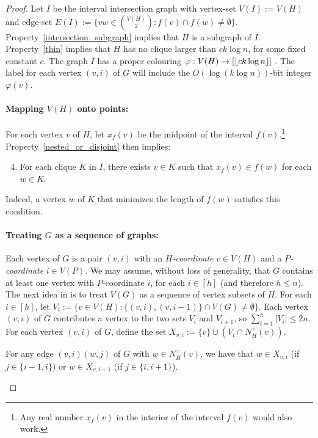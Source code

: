 \documentclass{patmorin}
\makeatletter
\renewcommand{\le}{\leqslant}
\newcommand{\defin}[1]{\emph{\textcolor{brightmaroon}{#1}}}
\def\mathcolor#1#{\@mathcolor{#1}}
\def\@mathcolor#1#2#3{%
  \protect\leavevmode
  \begingroup
    \color#1{#2}#3%
  \endgroup
}
\newcommand{\mathdefin}[1]{\mathcolor{brightmaroon}{#1}}
\newcommand{\Oh}{O}
\makeatother
\begin{document}
\begin{proof}
  Let $I$ be the interval intersection graph with vertex-set $V(I):=V(H)$ and edge-set $E(I):=\{vw\in\binom{V(H)}{2}:f(v)\cap f(w)\neq\emptyset\}$.
  Property~\ref{intersection_subgraph} implies that $H$ is a subgraph of $I$. Property~\ref{thin} implies that $H$ has no clique larger than $ck\log n$, for some fixed constant $c$.
  The graph $I$ has a proper colouring $\mathdefin{\varphi}:V(H)\to[\lfloor ck\log n\rfloor]$ \cite{gilmore.hoffman:characterization}.
  The label for each vertex $(v,i)$ of $G$ will include the $\Oh(\log (k\log n))$-bit integer $\varphi(v)$.

  \paragraph{\boldmath Mapping $V(H)$ onto points:}
  For each vertex $v$ of $H$, let $x_f(v)$ be the midpoint of the interval $f(v)$.\footnote{Any real number $x_f(v)$ in the interior of the interval $f(v)$ would also work.}  Property~\ref{nested_or_disjoint} then implies:
  \begin{enumerate}[nosep,label=(I\arabic*)]\setcounter{enumi}{3}
    \item\label{clique_property} For each clique $K$ in $I$, there exists $v\in K$ such that $x_f(v)\in f(w)$ for each $w\in K$.
  \end{enumerate}
  Indeed, a vertex $w$ of $K$ that minimizes the length of $f(w)$ satisfies this condition.

  \paragraph{\boldmath Treating $G$ as a sequence of graphs:}
  Each vertex of $G$ is a pair $(v,i)$ with an \defin{$H$-coordinate} $v\in V(H)$ and a \defin{$P$-coordinate} $i\in V(P)$.
  We may assume, without loss of generality, that $G$ contains at least one vertex with $P$-coordinate $i$, for each $i\in[h]$ (and therefore $h\le n$).
  The next idea in \cite{dujmovic.esperet.ea:adjacency} is to treat $V(G)$ as a sequence of vertex subsets of $H$.
  For each $i\in[h]$, let $V_i:=\{v\in V(H): \{(v,i),(v,i-1)\}\cap V(G)\neq\emptyset \}$.    Each vertex $(v,i)$ of $G$ contributes a vertex to the two sets $V_{i}$ and $V_{i+1}$, so $\sum_{i=1}^h |V_i|\le 2n$.  For each vertex $(v,i)$ of $G$, define the set $X_{v,i}:= \{v\}\cup (V_i\cap N^+_H(v))$.

  \begin{obs}\label{x_v_i_sufficient}
    For any edge $(v,i)(w,j)$ of $G$ with $w\in N^+_H(v)$, we have that $w\in X_{v,i}$ (if $j\in\{i-1,i\}$) or $w\in X_{v,i+1}$ (if $j\in\{i,i+1\}$).
  \end{obs}


\end{proof}
\end{document}
